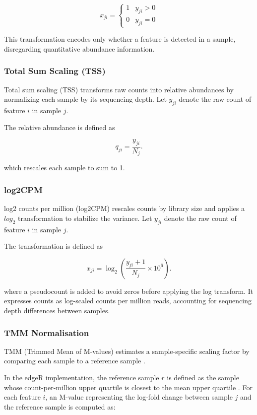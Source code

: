 \begin{bibunit}[apalike]
\begin{appendices}
\[
x_{ji} =
\begin{cases}
1 & y_{ji} > 0 \\
0 & y_{ji} = 0
\end{cases}
\]

This transformation encodes only whether a feature is detected in a sample, disregarding quantitative abundance information.


\subsubsection*{Total Sum Scaling (TSS)}



Total sum scaling (TSS) transforms raw counts into relative abundances by normalizing each sample by its sequencing depth. Let $y_{ji}$ denote the raw count of feature $i$ in sample $j$.

The relative abundance is defined as

\[
q_{ji}=\frac{y_{ji}}{N_j}.
\]

which rescales each sample to sum to 1.


\subsubsection*{log2CPM}

log2 counts per million (log2CPM) rescales counts by library size and applies a $log_{2}$ transformation to stabilize the variance. Let $y_{ji}$ denote the raw count of feature $i$ in sample $j$.

The transformation is defined as

\[
x_{ji}=\log_2\left(\frac{y_{ji}+1}{N_j}\times10^6\right).
\]

where a pseudocount is added to avoid zeros before applying the log transform. It expresses counts as log-scaled counts per million reads, accounting for sequencing depth differences between samples.


\subsubsection*{TMM Normalisation}

TMM (Trimmed Mean of M-values) estimates a sample-specific scaling factor by comparing each sample to a reference sample \citep{robinson_scaling_2010}.

In the edgeR implementation, the reference sample $r$ is defined as the sample whose count-per-million upper quartile is closest to the mean upper quartile \citep{robinson_edger_2010}. For each feature $i$, an M-value representing the log-fold change between sample $j$ and the reference sample is computed as:


\end{appendices}
\end{bibunit}
